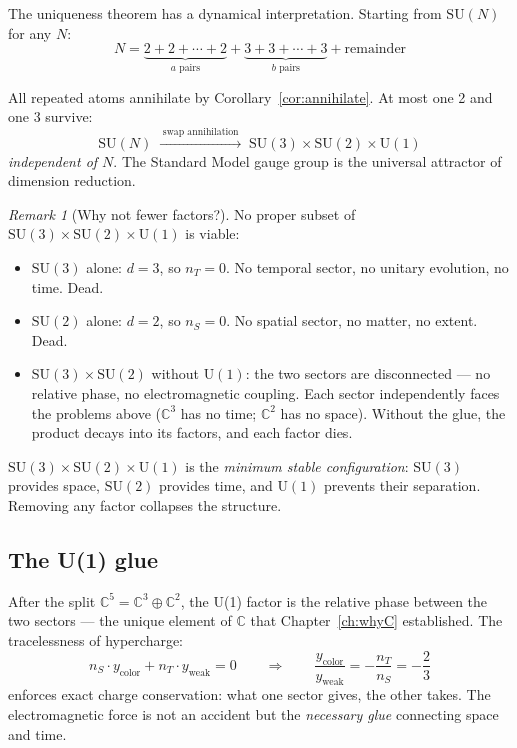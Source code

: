 \documentclass[12pt]{article}
\theoremstyle{remark}
\newtheorem{remark}[theorem]{Remark}
\theoremstyle{definition}
\newcommand{\CC}{\mathbb{C}}
\begin{document}
The uniqueness theorem has a dynamical interpretation. Starting from $\text{SU}(N)$ for any $N$:
\begin{equation}
N = \underbrace{2 + 2 + \cdots + 2}_{a\text{ pairs}} + \underbrace{3 + 3 + \cdots + 3}_{b\text{ pairs}} + \text{remainder}
\end{equation}

All repeated atoms annihilate by Corollary~\ref{cor:annihilate}. At most one 2 and one 3 survive:
\begin{equation}
\text{SU}(N) \;\xrightarrow{\;\text{swap annihilation}\;}\; \text{SU}(3) \times \text{SU}(2) \times \text{U}(1)
\end{equation}
\emph{independent of $N$}. The Standard Model gauge group is the universal attractor of dimension reduction.

\begin{remark}[Why not fewer factors?]
No proper subset of $\text{SU}(3) \times \text{SU}(2) \times \text{U}(1)$ is viable:
\begin{itemize}
\item $\text{SU}(3)$ alone: $d = 3$, so $n_T = 0$. No temporal sector, no unitary evolution, no time. Dead.
\item $\text{SU}(2)$ alone: $d = 2$, so $n_S = 0$. No spatial sector, no matter, no extent. Dead.
\item $\text{SU}(3) \times \text{SU}(2)$ without $\text{U}(1)$: the two sectors are disconnected --- no relative phase, no electromagnetic coupling. Each sector independently faces the problems above ($\CC^3$ has no time; $\CC^2$ has no space). Without the glue, the product decays into its factors, and each factor dies.
\end{itemize}
$\text{SU}(3) \times \text{SU}(2) \times \text{U}(1)$ is the \emph{minimum stable configuration}: $\text{SU}(3)$ provides space, $\text{SU}(2)$ provides time, and $\text{U}(1)$ prevents their separation. Removing any factor collapses the structure.
\end{remark}

\subsection{The U(1) glue}
\label{sec:glue}

After the split $\CC^5 = \CC^3 \oplus \CC^2$, the U(1) factor is the relative phase between the two sectors --- the unique element of $\CC$ that Chapter~\ref{ch:whyC} established. The tracelessness of hypercharge:
\begin{equation}
n_S \cdot y_\text{color} + n_T \cdot y_\text{weak} = 0 \qquad\Rightarrow\qquad \frac{y_\text{color}}{y_\text{weak}} = -\frac{n_T}{n_S} = -\frac{2}{3}
\end{equation}
enforces exact charge conservation: what one sector gives, the other takes. The electromagnetic force is not an accident but the \emph{necessary glue} connecting space and time.
\end{document}

